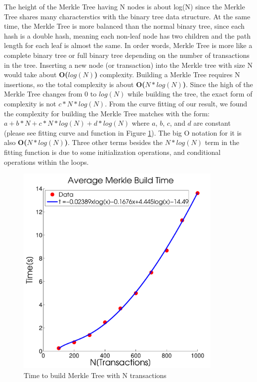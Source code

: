 \documentclass[pdftex,11pt]{article}
\begin{document}
The height of the Merkle Tree having N nodes is about log(N) since the Merkle Tree shares many characterstics with the binary tree data structure. At the same time, the Merkle Tree is more balanced than the normal binary tree, since each hash is a double hash, meaning each non-leaf node has two children and the path length for each leaf is almost the same. In order words, Merkle Tree is more like a complete binary tree or full binary tree depending on the number of transactions in the tree. Inserting a new node (or transaction) into the Merkle tree with size N would take about {\bf O($log(N)$)} complexity. Building a Merkle Tree requires N insertions, so the total complexity is about {\bf O($N*log(N)$)}. Since the high of the Merkle Tree changes from 0 to $log(N)$ while building the tree, the exact form of complexity is not $c*N*log(N)$. From the curve fitting of our result, we found the complexity for building the Merkle Tree matches with the form: $a+b*N+c*N*log(N)+d*log(N)$ where $a$, $b$, $c$, and $d$ are constant (please see fitting curve and function in Figure \ref{MerkComp}). The big O notation for it is also {\bf O($N*log(N)$)}. Three other terms besides the $N*log(N)$ term in the fitting function is due to some initialization operations, and conditional operations within the loops.

\begin{figure}[H]
	\centering
	\includegraphics[width=100mm]{figures/MerkComp.pdf}
	\caption{Time to build Merkle Tree with N transactions}
	\label{MerkComp}
\end{figure}
\end{document}
